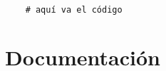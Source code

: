 \documentclass[a4paper,12pt]{article}
\begin{document}
\begin{verbatim}
    # aquí va el código 
\end{verbatim}









\section{Documentación}





\newpage %
\thispagestyle{fancyref}
\printbibliography %
\end{document}
